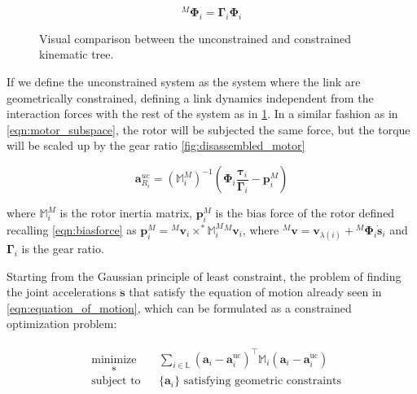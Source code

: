 \begin{equation}
    \label{eqn:motor_subspace}
    {} ^M \boldsymbol{\Phi} _i = \boldsymbol{\Gamma} _i \boldsymbol{\Phi} _i
\end{equation}


\begin{figure}
    \centering
    \caption{Visual comparison between the unconstrained and constrained kinematic tree.}
    \label{fig:uc_and_constr_tree}
\end{figure}

If we define the unconstrained system as the system where the link are geometrically constrained, defining a link dynamics independent from the interaction forces with the rest of the system as in \cref{fig:uc_and_constr_tree}. In a similar fashion as in \cref{eqn:motor_subspace}, the rotor will be subjected the same force, but the torque will be scaled up by the gear ratio \cref{fig:disassembled_motor}

\begin{equation}
    \mathbf{a} ^{uc} _{R _i} = (\mathbb{M} ^M _i) ^{-1}(\boldsymbol{\Phi} _i \frac{\boldsymbol{\tau} _i}{\boldsymbol{\Gamma} _i} - \mathbf{p} ^M _i)
\end{equation}

where $\mathbb{M} ^M _i$ is the rotor inertia matrix, $\mathbf{p} ^M _i$ is the bias force of the rotor defined recalling \cref{eqn:biasforce} as  $\mathbf{p} ^M _i = {} ^M \mathbf{v} _i\times ^* \mathbb{M} ^M _i {} ^M \mathbf{v} _i$, where ${} ^M \mathbf{v} = \mathbf{v} _{\lambda (i)} + {} ^M \boldsymbol{\Phi} _i \dot{\mathbf{s}} _i$ and $\boldsymbol{\Gamma} _i$ is the gear ratio.

Starting from the Gaussian principle of least constraint, the problem of finding the joint accelerations $\ddot{\mathbf{s}}$ that satisfy the equation of motion already seen in \cref{eqn:equation_of_motion}, which can be formulated as a constrained optimization problem:

\begin{align}
    \label{eqn:aba_optim}
    \begin{aligned}
         & \underset{\ddot{\mathbf{s}}}{\text{minimize}}
         &                                               & \sum _{i \in \mathbb{L}} (\mathbf{a}_i - \mathbf{a} _i ^{\text{uc} }) ^\top \mathbb{M}_i(\mathbf{a}_i - \mathbf{a} ^{\text{uc}} _i) \\
         & \text{subject to}
         &                                               & \{\mathbf{a}_i\} \text{ satisfying geometric constraints}
    \end{aligned}
\end{align}

